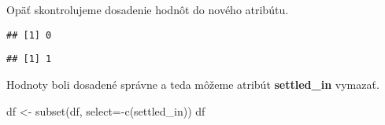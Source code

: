\documentclass[
]{article}
\newenvironment{Shaded}{\begin{snugshade}}{\end{snugshade}}
\newcommand{\AttributeTok}[1]{\textcolor[rgb]{0.77,0.63,0.00}{#1}}
\newcommand{\FunctionTok}[1]{\textcolor[rgb]{0.00,0.00,0.00}{#1}}
\newcommand{\NormalTok}[1]{#1}
\newcommand{\OtherTok}[1]{\textcolor[rgb]{0.56,0.35,0.01}{#1}}
\newcommand{\SpecialCharTok}[1]{\textcolor[rgb]{0.00,0.00,0.00}{#1}}
\newcommand{\StringTok}[1]{\textcolor[rgb]{0.31,0.60,0.02}{#1}}
\begin{document}
Opäť skontrolujeme dosadenie hodnôt do nového atribútu.

\begin{Shaded}
\end{Shaded}

\begin{verbatim}
## [1] 0
\end{verbatim}

\begin{Shaded}
\end{Shaded}

\begin{verbatim}
## [1] 1
\end{verbatim}

Hodnoty boli dosadené správne a teda môžeme atribút \textbf{settled\_in}
vymazať.

\begin{Shaded}
\begin{Highlighting}[]
\NormalTok{df }\OtherTok{\textless{}{-}} \FunctionTok{subset}\NormalTok{(df, }\AttributeTok{select=}\SpecialCharTok{{-}}\FunctionTok{c}\NormalTok{(settled\_in))}
\NormalTok{df}
\end{Highlighting}
\end{Shaded}
\end{document}
